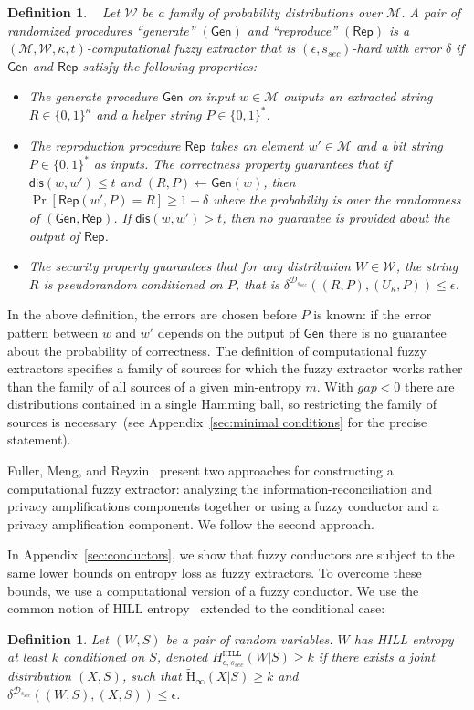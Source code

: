 \documentclass[11pt]{article}
\newcommand{\apref}[1]{\mbox{Appendix~\ref{#1}}}
\newcommand{\class}[1]{{\ensuremath{\mathsf{#1}}}}
\newcommand{\gen}{\ensuremath{\class{Gen}}\xspace}
\newcommand{\rep}{\ensuremath{\class{Rep}}\xspace}
\newcommand{\dis}{\ensuremath{\mathsf{dis}}}
\newcommand{\hill}{\ensuremath{\mathtt{HILL}}\xspace}
\newcommand{\Hav}{\tilde{\mathrm{H}}_\infty}
\newtheorem{definition}[theorem]{Definition}
\begin{document}
\begin{definition}~\cite[Definition 2.5]{fuller2013computational}
\label{def:comp fuzzy extractor}
Let $\mathcal{W}$ be a family of probability distributions over $\mathcal{M}$. A pair of randomized procedures ``generate'' $(\gen)$ and ``reproduce'' $(\rep)$ is a $(\mathcal{M}, \mathcal{W}, \kappa, t)$-\emph{computational fuzzy extractor} that is $(\epsilon, s_{sec})$-hard with error $\delta$ if \gen and \rep satisfy the following properties:
\begin{itemize}
\item The generate procedure \gen on input $w\in \mathcal{M}$ outputs an extracted string $R\in\{0,1\}^\kappa$ and a helper string $P\in\{0,1\}^*$.
\item The reproduction procedure \rep takes an element $w'\in\mathcal{M}$ and a bit string $P\in\{0,1\}^*$ as inputs.  The \emph{correctness} property guarantees that if $\dis(w, w')\leq t$ and $(R, P)\leftarrow \gen(w)$, then $\Pr[\rep( w', P) = R] \geq 1-\delta$ where the probability is over the randomness of $(\gen, \rep)$.
If $\dis(w, w') > t$, then no guarantee is provided about the output of \rep.
\item The \emph{security} property guarantees that for any distribution $W\in \mathcal{W}$, the string $R$ is pseudorandom conditioned on $P$, that is $\delta^{\mathcal{D}_{s_{sec}}}((R, P), (U_\kappa, P))\leq \epsilon$.
\end{itemize}
\end{definition}
In the above definition, the errors are chosen before $P$ is known: if the error pattern between $w$ and $w'$ depends on the output of $\gen$ there is no guarantee about the probability of correctness.
The definition of computational fuzzy extractors specifies a family of sources for which the fuzzy extractor works rather than the family of all sources of a given min-entropy $m$.  With $gap<0$ there are distributions contained in a single Hamming ball, so restricting the family of sources is necessary~(see \apref{sec:minimal conditions} for the precise statement).

Fuller, Meng, and Reyzin~\cite{fuller2013computational} present two approaches for constructing a computational fuzzy extractor: analyzing the information-reconciliation and privacy amplifications components together or using a fuzzy conductor and a privacy amplification component.  We follow the second approach.

In \apref{sec:conductors}, we show that fuzzy conductors are subject to the same lower bounds on entropy loss as fuzzy extractors.  To overcome these bounds, we use a computational version of a fuzzy conductor.
We use the common notion of HILL entropy~\cite{DBLP:journals/siamcomp/HastadILL99} extended to the conditional case:
\begin{definition}
\label{def:hill ent}
Let $(W, S)$ be a pair of random variables.  $W$ has
\emph{HILL entropy} at least $k$ conditioned on $S$,
denoted $H^{\hill}_{\epsilon, s_{sec}}(W|S)\geq k$ if there exists a joint distribution $(X, S)$, such that $\Hav(X|S)\geq k$ and $\delta^{\mathcal{D}_{s_{sec}}} ((W, S),(X,S))\leq \epsilon$.
\end{definition}
\end{document}
